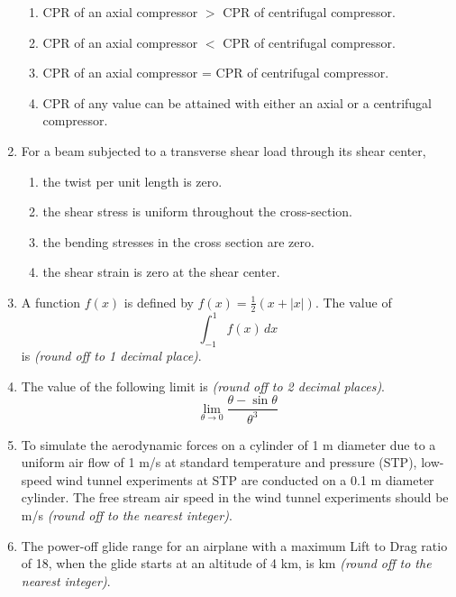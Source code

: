 \documentclass[12pt]{article}
\begin{document}
\begin{enumerate}[label=Q.\arabic*]
		\begin{enumerate}[label=(\Alph*)]
			\item CPR of an axial compressor $>$ CPR of centrifugal compressor.
			\item CPR of an axial compressor $<$ CPR of centrifugal compressor.
			\item CPR of an axial compressor = CPR of centrifugal compressor.
			\item CPR of any value can be attained with either an axial or a centrifugal compressor.
		\end{enumerate}
	\item For a beam subjected to a transverse shear load through its shear center,
		\begin{enumerate}[label=(\Alph*)]
			\item the twist per unit length is zero.
			\item the shear stress is uniform throughout the cross-section.
			\item the bending stresses in the cross section are zero.
			\item the shear strain is zero at the shear center.
		\end{enumerate}

	\item A function $f(x)$ is defined by $f(x) = \frac{1}{2}(x + |x|)$. The value of
		\[
			\int_{-1}^{1} f(x)\, dx
		\]
		is \underline{\hspace{1cm}} \textit{(round off to 1 decimal place)}.

	\item The value of the following limit is \underline{\hspace{1cm}} \textit{(round off to 2 decimal places)}.
		\[
			\lim_{\theta \to 0} \frac{\theta - \sin \theta}{\theta^3}
		\]
	\item To simulate the aerodynamic forces on a cylinder of 1 m diameter due to a uniform air flow of 1 m/s at standard temperature and pressure (STP), low-speed wind tunnel experiments at STP are conducted on a 0.1 m diameter cylinder. The free stream air speed in the wind tunnel experiments should be \underline{\hspace{1.5cm}} m/s \textit{(round off to the nearest integer)}.

	\item The power-off glide range for an airplane with a maximum Lift to Drag ratio of 18, when the glide starts at an altitude of 4 km, is \underline{\hspace{1.5cm}} km \textit{(round off to the nearest integer)}.


\end{enumerate}
\end{document}
